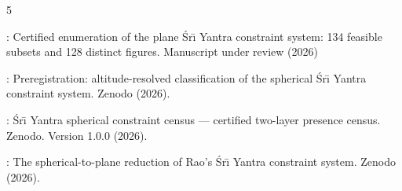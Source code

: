\documentclass[pdflatex,sn-mathphys-num]{sn-jnl}
\theoremstyle{thmstyleone}%
\theoremstyle{thmstyletwo}%
\theoremstyle{thmstylethree}%
\begin{document}
\begin{thebibliography}{5}
\begin{botherref}
:
Certified enumeration of the plane {\'S}r{\={\i}} {Yantra} constraint system:
  134 feasible subsets and 128 distinct figures.
Manuscript under review
(2026)
\end{botherref}
\endbibitem

\begin{botherref}
:
Preregistration: altitude-resolved classification of the spherical
  {\'S}r{\={\i}} {Yantra} constraint system.
Zenodo
(2026).
\end{botherref}
\endbibitem

\begin{botherref}
:
{\'S}r{\={\i}} {Yantra} spherical constraint census --- certified two-layer
  presence census.
Zenodo.
Version 1.0.0
(2026).
\end{botherref}
\endbibitem

\begin{botherref}
:
The spherical-to-plane reduction of {Rao}'s {\'S}r{\={\i}} {Yantra} constraint
  system.
Zenodo
(2026).
\end{botherref}
\endbibitem

\end{thebibliography}
\end{document}
